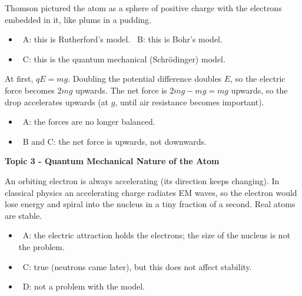 \documentclass[12pt]{article}
\newcommand\anstopic[1]{\par\Needspace{8\baselineskip}\vspace{4mm}%
  \begin{center}{\headfont\bfseries\fontsize{14}{18}\selectfont #1\par}\end{center}\vspace{2pt}}
\begin{document}
\begin{practiceanswers}
\begin{practiceans}
  Thomson pictured the atom as a sphere of positive charge with the electrons embedded in it, like plums
  in a pudding.
  \begin{itemize}
    \item \xmark\ A: this is Rutherford's model. \quad \xmark\ B: this is Bohr's model.
    \item \xmark\ C: this is the quantum mechanical (Schrödinger) model.
  \end{itemize}
\end{practiceans}

\begin{practiceans}
  At first, $qE = mg$. Doubling the potential difference doubles $E$, so the electric force becomes $2mg$
  upwards. The net force is $2mg - mg = mg$ upwards, so the drop accelerates upwards (at $g$, until air
  resistance becomes important).
  \begin{itemize}
    \item \xmark\ A: the forces are no longer balanced.
    \item \xmark\ B and C: the net force is upwards, not downwards.
  \end{itemize}
\end{practiceans}

\anstopic{Topic 3 - Quantum Mechanical Nature of the Atom}

\begin{practiceans}
  An orbiting electron is always accelerating (its direction keeps changing). In classical physics an
  accelerating charge radiates EM waves, so the electron would lose energy and spiral into the nucleus in
  a tiny fraction of a second. Real atoms are stable.
  \begin{itemize}
    \item \xmark\ A: the electric attraction holds the electrons; the size of the nucleus is not the
          problem.
    \item \xmark\ C: true (neutrons came later), but this does not affect stability.
    \item \xmark\ D: not a problem with the model.
  \end{itemize}
\end{practiceans}


\end{practiceanswers}
\end{document}
